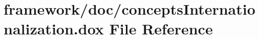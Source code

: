\hypertarget{concepts_internationalization_8dox}{}\section{framework/doc/concepts\+Internationalization.dox File Reference}
\label{concepts_internationalization_8dox}

